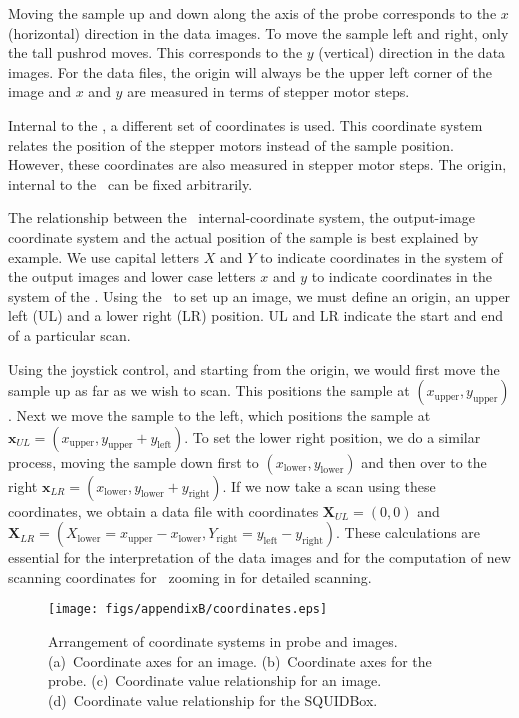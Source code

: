 Moving the sample up and down along the axis of the probe corresponds to the 
$x$ (horizontal) direction in the data images. To move the sample
left and right, only the tall pushrod moves. This corresponds to the
$y$ (vertical) direction in the data images. For the data files, the origin
will always be the upper left corner of the image and  $x$ and $y$ are
measured
in terms of stepper motor steps.
 
Internal to the \squidbox, a different
set of coordinates is used. This coordinate system  relates the position
of the stepper motors instead of the sample position.
However, these coordinates are also measured in stepper motor
steps.
The origin, internal to the \squidbox\ can be fixed 
arbitrarily. 

The relationship between the \squidbox\ internal-coordinate system, 
the output-image coordinate system and the actual position of the 
sample
is best 
explained by example. We use capital letters $X$ and $Y$ to 
indicate coordinates in the system of the output images and lower case
letters $x$ and $y$ to indicate coordinates in the system of the 
\squidbox. Using the \squidbox\ to set up an image,
we must define an origin, an upper left (UL) and a lower 
right (LR) position. UL and LR indicate the start and end of a 
particular scan. 

Using the joystick control, and starting from the origin, we would 
first move the sample up as far as we wish to scan. This positions 
the sample at $(x_{\mathrm{upper}},y_{\mathrm{upper}})$. 
Next we move the sample
to the left, which positions the sample at 
$\mathbf{x}_{UL}=(x_{\mathrm{upper}},y_{\mathrm{upper}}+y_{\mathrm{left}})$. 
To set the lower right position, we do a similar process,
moving the sample down first to $(x_{\mathrm{lower}},y_{\mathrm{lower}})$ 
and then
over to the right $\mathbf{x}_{LR}=(x_{\mathrm{lower}},y_{\mathrm{lower}}
+y_{\mathrm{right}})$. 
If we now take a scan using these coordinates, we obtain a data file
with coordinates $\mathbf{X}_{UL}=(0,0)$
and $\mathbf{X}_{LR}=(X_{\mathrm{lower}}
=x_{\mathrm{upper}}-x_{\mathrm{lower}},Y_{\mathrm{right}}=
y_{\mathrm{left}}-y_{\mathrm{right}})$.
These calculations are essential for the interpretation of the data
images and for the computation of new scanning coordinates for
\eg\ zooming in for detailed scanning. 

\begin{figure}[p]
\texttt{[image: figs/appendixB/coordinates.eps]}
\caption[Arrangement of coordinate systems in probe and images.]
{Arrangement of coordinate systems in probe and images.
(a)~Coordinate axes for an image. (b)~Coordinate axes for the 
probe. (c)~Coordinate value relationship for an image.
(d)~Coordinate value relationship for the SQUIDBox.}
\label{fig:coordinate_systems}
\end{figure}


